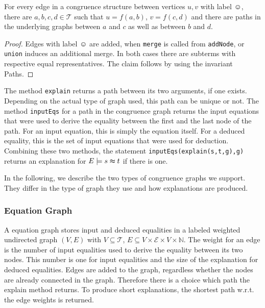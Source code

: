 \begin{invariant}

For every edge in a congruence structure between vertices $u,v$ with label $\smiley$, 
there are $a,b,c,d \in \mathcal{T}$ such that $u = f(a,b)$, $v = f(c,d)$ and
there are paths in the underlying graphs between $a$ and $c$ as well as between $b$ and $d$.

\end{invariant}

\begin{proof}

Edges with label $\smiley$ are added, when \texttt{merge} is called from \texttt{addNode}, or \texttt{union} induces an additional merge.
In both cases there are subterms with respective equal representatives.
The claim follows by using the invariant Paths.

\end{proof}

The method \texttt{explain} returns a path between its two arguments, if one exists.
Depending on the actual type of graph used, this path can be unique or not.
The method \texttt{inputEqs} for a path in the congruence graph returns the input equations that were used to derive the equality between the first and the last node of the path.
For an input equation, this is simply the equation itself.
For a deduced equality, this is the set of input equations that were used for deduction.
Combining these two methods, the statement \texttt{inputEqs(explain(s,t,g),g)} returns an explanation for $E \models s \thickapprox t$ if there is one.



In the following, we describe the two types of congruence graphs we support.
They differ in the type of graph they use and how explanations are produced.

\subsubsection*{Equation Graph}

A equation graph stores input and deduced equalities in a labeled weighted undirected graph $(V,E)$ with 
$V \subseteq \mathcal{T}$, $E \subseteq V \times \mathcal{E} \times V \times \mathbb{N}$.
The weight for an edge is the number of input equalities used to derive the equality between its two nodes.
This number is one for input equalities and the size of the explanation for deduced equalities.
Edges are added to the graph, regardless whether the nodes are already connected in the graph.
Therefore there is a choice which path the explain method returns.
To produce short explanations, the shortest path w.r.t. the edge weights is returned.

